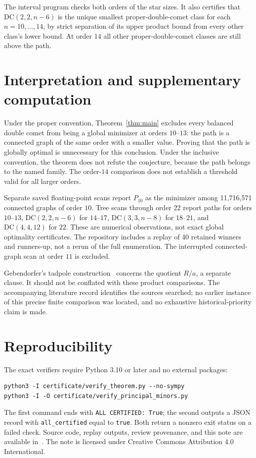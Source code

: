 \documentclass[11pt]{article}
\newcommand{\DC}{\mathrm{DC}}
\begin{document}
The interval program checks both orders of the star sizes. It also
certifies that $\DC(2,2,n-6)$ is the unique smallest proper-double-comet
class for each $n=10,\ldots,14$, by strict separation of its upper
product bound from every other class's lower bound. At order $14$ all
other proper-double-comet classes are still above the path.

\section{Interpretation and supplementary computation}
Under the proper convention, Theorem~\ref{thm:main} excludes every
balanced double comet from being a global minimizer at orders $10$--$13$:
the path is a connected graph of the same order with a smaller value.
Proving that the path is globally optimal is unnecessary for this
conclusion. Under the inclusive convention, the theorem does not refute
the conjecture, because the path belongs to the named family.
The order-$14$ comparison does not establish a threshold valid for all
larger orders.

Separate saved floating-point scans report $P_{10}$ as the minimizer
among 11,716,571 connected graphs of order $10$. Tree scans through order
$22$ report paths for orders $10$--$13$, $\DC(2,2,n-6)$ for $14$--$17$,
$\DC(3,3,n-8)$ for $18$--$21$, and $\DC(4,4,12)$ for $22$.
These are numerical observations, not exact global optimality
certificates. The repository includes a replay of 40 retained winners
and runners-up, not a rerun of the full enumeration. The interrupted
connected-graph scan at order $11$ is excluded.

Gebendorfer's tadpole construction~\cite{Geb} concerns the quotient
$R/a$, a separate clause. It should not be conflated with these product
comparisons. The accompanying literature record identifies the sources
searched; no earlier instance of this precise finite comparison was
located, and no exhaustive historical-priority claim is made.

\section*{Reproducibility}
The exact verifiers require Python 3.10 or later and no external packages:
\begin{verbatim}
python3 -I certificate/verify_theorem.py --no-sympy
python3 -I -O certificate/verify_principal_minors.py
\end{verbatim}
The first command ends with \texttt{ALL CERTIFIED: True}; the second
outputs a JSON record with \texttt{all\_certified} equal to \texttt{true}.
Both return a nonzero exit status on a failed check. Source code, replay
outputs, review provenance, and this note are available in~\cite{artifact}.
The note is licensed under Creative Commons Attribution 4.0 International.
\end{document}
